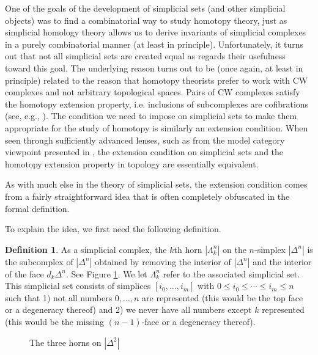 \documentclass[12pt]{article}
\theoremstyle{plain}
\theoremstyle{definition}
\newtheorem{definition}[theorem]{Definition}
\theoremstyle{remark}
\begin{document}
One of the goals of the development of simplicial sets (and other simplicial objects) was to find a  combinatorial way to study homotopy theory, just as simplicial homology theory allows us to derive invariants of simplicial complexes in a purely combinatorial manner (at least in principle).
Unfortunately, it turns out that not all simplicial sets are created equal as regards their usefulness toward this goal. The underlying reason turns out to be (once again, at least in principle) related to the reason that homotopy theorists prefer to work with CW complexes and not arbitrary topological spaces. Pairs of CW complexes satisfy the homotopy extension property, i.e. inclusions of subcomplexes are cofibrations (see, e.g., \cite{DK}). The condition we need to impose on simplicial sets to make them appropriate for the study of homotopy is similarly an extension condition. When seen through sufficiently advanced lenses, such as from the model category viewpoint presented in  \cite{GoeJar}, the extension condition on simplicial sets and the homotopy extension property in topology are essentially equivalent. 

As with much else in the theory of simplicial sets, the extension condition comes from a fairly straightforward idea that is often completely obfuscated in the formal definition. 

To explain the idea, we first need the following definition. 

\begin{definition}
As a simplicial complex, the $k$th horn $|\Lambda^n_k|$ on the $n$-simplex $|\Delta^n|$ is the subcomplex of $|\Delta^n|$ obtained by removing the interior of $|\Delta^n|$ and the interior of the face $d_k\Delta^n$. See Figure \ref{F: fig18}. We let $\Lambda^n_k$ refer to the associated simplicial set. This simplicial set consists of simplices $[i_0,\ldots,i_m]$ with $0\leq i_0\leq \cdots\leq i_m\leq n$ such that 1) not all numbers $0,\ldots, n$ are represented (this would be the top face or a degeneracy thereof) and 2) we never have all numbers except $k$ represented (this would be the missing $(n-1)$-face or a degeneracy thereof).  
\end{definition}


\begin{figure}[!htp]
\begin{center}
\end{center}
\caption{The three horns on $|\Delta^2|$}\label{F: fig18}
\end{figure}
\end{document}
